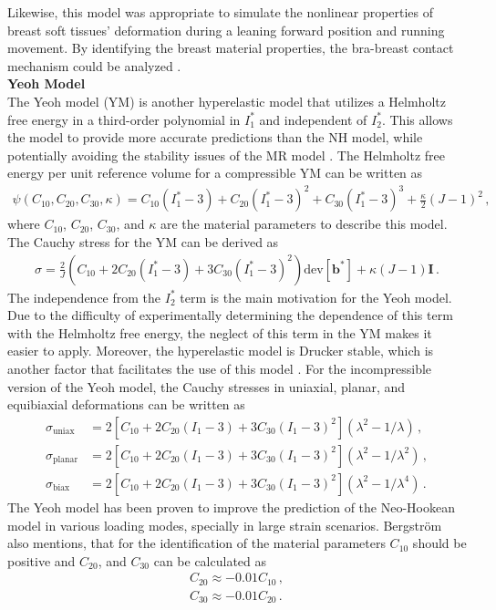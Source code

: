 Likewise, this model was appropriate to simulate the nonlinear properties of breast soft tissues' deformation 
during a leaning forward position and running movement. By identifying the breast material properties, the bra-breast contact mechanism 
could be analyzed \cite{Sun2019}.\\ 

\textbf{Yeoh Model}\\

The Yeoh model (YM) is another hyperelastic model that utilizes a Helmholtz free energy 
in a third-order polynomial in $I_1^*$ and independent of $I_2^*$. This allows the model to provide 
more accurate predictions than the NH model, while potentially avoiding the stability issues of the 
MR model \cite{Bergström2015}. The Helmholtz free energy per unit reference volume for a compressible YM can be written as
\begin{align}
        \psi(C_{10}, C_{20}, C_{30}, \kappa) = C_{10}(I_1^* - 3) + C_{20}(I_1^* - 3)^2 + C_{30}(I_1^* - 3)^3 + \frac{\kappa}{2}(J - 1)^2 \, ,
        \label{eq:helmholtzYM}
\end{align}
where $C_{10}$, $C_{20}$, $C_{30}$, and $\kappa$ are the material parameters to describe this model. The Cauchy stress 
for the YM can be derived as 
\begin{align}
        \sigma = \frac{2}{J}(C_{10} + 2C_{20}(I_1^* - 3) + 3C_{30}(I_1^* - 3)^2)\text{dev}[\boldsymbol{b}^*] + \kappa(J - 1)\boldsymbol{I}\, .
        \label{eq:cauchystressYM}
\end{align}
The independence from the $I_2^*$ term is the main motivation for the Yeoh model. Due to the difficulty of experimentally 
determining the dependence of this term with the Helmholtz free energy, the neglect of this term in the YM makes 
it easier to apply. Moreover, the hyperelastic model is Drucker stable, which is another factor that facilitates the use of this model \cite{Bergström2015}.
For the incompressible version of the Yeoh model, the Cauchy stresses in uniaxial, planar, and equibiaxial deformations can be written as
\begin{align}
        \sigma_{\text{uniax}} &= 2[C_{10} + 2C_{20}(I_1 - 3) + 3C_{30}(I_1 - 3)^2](\lambda^2 - 1/\lambda) \, , \label{eq:uniaxYM} \\
        \sigma_{\text{planar}} &= 2[C_{10} + 2C_{20}(I_1 - 3) + 3C_{30}(I_1 - 3)^2](\lambda^2 - 1/\lambda^2) \, , \label{eq:planarYM} \\
        \sigma_{\text{biax}} &= 2[C_{10} + 2C_{20}(I_1 - 3) + 3C_{30}(I_1 - 3)^2](\lambda^2 - 1/\lambda^4) \, . \label{eq:biaxyM}
\end{align}
The Yeoh model has been proven to improve the prediction of the Neo-Hookean model in various loading modes, specially in large strain scenarios.
Bergström also mentions, that for the identification of the material parameters $C_{10}$ should be positive and $C_{20}$, and $C_{30}$ 
can be calculated as
\begin{align}
        C_{20} \approx -0.01C_{10} \,, \\
        C_{30} \approx -0.01C_{20} \, .
\end{align}

